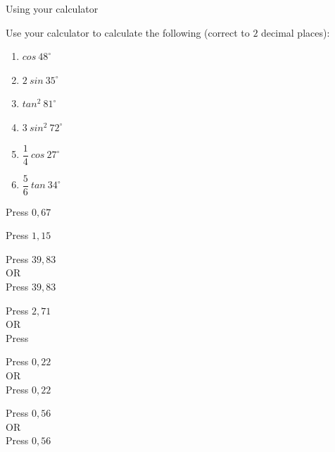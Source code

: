 \begin{wex}{Using your calculator}

 {Use your calculator to calculate the following (correct to $2$ decimal places):
\begin{enumerate}[itemsep=4pt, label=\textbf{\arabic*}. ] 
 \item $cos~48^{\circ}$
\item $2~sin~35^{\circ}$
\item $tan^{2}~81^{\circ}$
\item $3~sin^{2}~72^{\circ}$
\item $\dfrac{1}{4}~cos~27^{\circ} $
\item $\dfrac{5}{6}~tan~34^{\circ}$
\end{enumerate}

}
{

\westep{}
Press   \fbox{\LARGE =} $0,67$

\westep{}
Press    \fbox{\LARGE =} $1,15$

\westep{}
Press \fbox{(}   \fbox{)}   \fbox{\LARGE =} $39,83$
\\
OR\\
Press   \fbox{\LARGE =}   \fbox{\LARGE =} $39,83$

\westep{}
Press  \fbox{(}   \fbox{)}  \fbox{\LARGE =} $2,71$
\\
OR\\
Press   \fbox{\LARGE =}   \fbox{\LARGE =}  \fbox{$\times$} 

\westep{}
Press \fbox{(}  \fbox{$\div$}  \fbox{)}   \fbox{\LARGE =} $0,22$
\\
OR\\
Press   \fbox{\LARGE =}  \fbox{$\div$}  \fbox{\LARGE =} $0,22$

\westep{}
Press \fbox{(}  \fbox{$\div$}  \fbox{)}   \fbox{\LARGE =} $0,56$
\\
OR\\
Press   \fbox{\LARGE =}  \fbox{$\times$}  \fbox{$\div$}  \fbox{\LARGE =} $0,56$

}
\end{wex}

